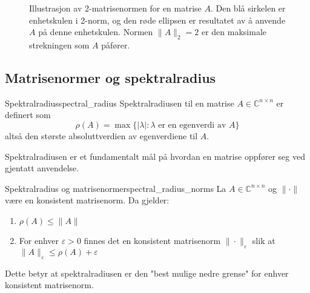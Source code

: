 \begin{figure}
	\centering
	\caption{Illustrasjon av 2-matrisenormen for en matrise $A$. Den blå sirkelen er enhetskulen i 2-norm, og den røde ellipsen er resultatet av å anvende $A$ på denne enhetskulen. Normen $\|A\|_2 = 2$ er den maksimale strekningen som $A$ påfører.}
	\label{fig:matrix_norm}
\end{figure}

\subsection{Matrisenormer og spektralradius}

\begin{definition}{Spektralradius}{spectral_radius}
	Spektralradiusen til en matrise $A \in \mathbb{C}^{n \times n}$ er definert som
	\[
		\rho(A) = \max\{|\lambda| : \lambda \text{ er en egenverdi av } A\}
	\]
	altså den største absoluttverdien av egenverdiene til $A$.
\end{definition}

Spektralradiusen er et fundamentalt mål på hvordan en matrise oppfører seg ved gjentatt anvendelse.

\begin{theorem}{Spektralradius og matrisenormer}{spectral_radius_norms}
	La $A \in \mathbb{C}^{n \times n}$ og $\|\cdot\|$ være en konsistent matrisenorm. Da gjelder:
	\begin{enumerate}
		\item $\rho(A) \leq \|A\|$
		\item For enhver $\varepsilon > 0$ finnes det en konsistent matrisenorm $\|\cdot\|_\varepsilon$ slik at $\|A\|_\varepsilon \leq \rho(A) + \varepsilon$
	\end{enumerate}
\end{theorem}

Dette betyr at spektralradiusen er den "best mulige nedre grense" for enhver konsistent matrisenorm.

